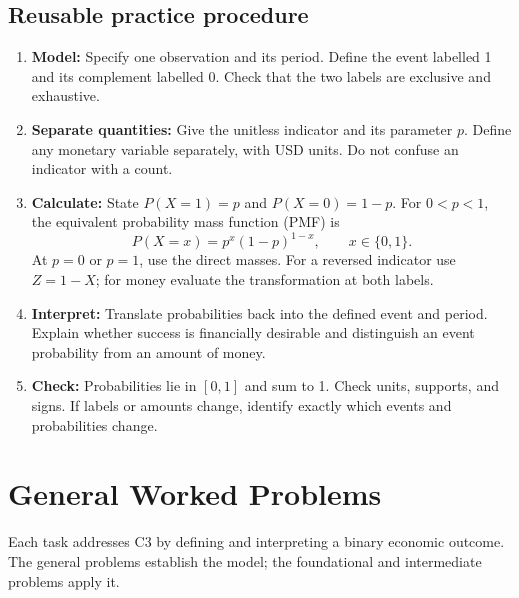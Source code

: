 \subsection{Reusable practice procedure}
\begin{enumerate}
\item \textbf{Model:} Specify one observation and its period. Define the event labelled 1 and its complement labelled 0. Check that the two labels are exclusive and exhaustive.
\item \textbf{Separate quantities:} Give the unitless indicator and its parameter $p$. Define any monetary variable separately, with USD units. Do not confuse an indicator with a count.
\item \textbf{Calculate:} State $P(X=1)=p$ and $P(X=0)=1-p$. For $0<p<1$, the equivalent probability mass function (PMF) is
\[P(X=x)=p^x(1-p)^{1-x},\qquad x\in\{0,1\}.\]
At $p=0$ or $p=1$, use the direct masses. For a reversed indicator use $Z=1-X$; for money evaluate the transformation at both labels.
\item \textbf{Interpret:} Translate probabilities back into the defined event and period. Explain whether success is financially desirable and distinguish an event probability from an amount of money.
\item \textbf{Check:} Probabilities lie in $[0,1]$ and sum to 1. Check units, supports, and signs. If labels or amounts change, identify exactly which events and probabilities change.
\end{enumerate}

\clearpage
\section{General Worked Problems}\label{sec:t2-c3-general}
\label{sec:t2-c3-foundational}\label{sec:t2-c3-intermediate}
Each task addresses C3 by defining and interpreting a binary economic outcome.
The general problems establish the model; the foundational and intermediate problems apply it.

